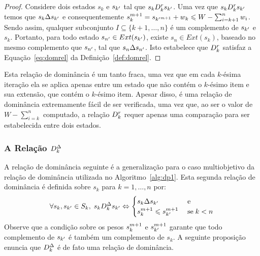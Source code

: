 \begin{proof}
  \noindent
      Considere dois estados $s_k$ e $s_{{k'}}$ tal que $s_k D_k^r s_{{k'}}$.
      Uma vez que $s_k D_k^r s_{{k'}}$ temos que $s_k \Delta s_{{k'}}$ e consequentemente
      $s_k^{m+1} = s_{{k'}^{m+1}} + w_k \leqslant W - \sum_{i=k+1}^n w_i$.
      Sendo assim, qualquer subconjunto $I \subseteq \{k+1, \ldots, n\}$ é um complemento
      de $s_{{k'}}$ e $s_k$.
      Portanto, para todo estado $s_{{n'}} \in Ext(s_{{k'}})$,
      existe $s_n \in Ext(s_k)$, baseado no mesmo complemento que $s_{{n'}}$,
      tal que $s_n \Delta s_{{n'}}$.
      Isto estabelece que $D_k^r$ satisfaz a Equação~\ref{eq:domrel} da
      Definição~\ref{def:domrel}.
    \qedhere
\end{proof}

Esta relação de dominância é um tanto fraca, uma vez que em cada $k$-ésima
iteração ela se aplica apenas entre um estado que não contém o $k$-ésimo item
e sua extensão, que contém o $k$-ésimo item.
Apesar disso, é uma relação de dominância extremamente fácil de ser verificada,
uma vez que, ao ser o valor de $W - \sum_{i=k}^n$ computado, a relação $D_k^r$
requer apenas uma comparação para ser estabelecida entre dois estados.

\subsubsection{A Relação $D_k^{\Delta}$}
A relação de dominância seguinte é a generalização para o caso multiobjetivo
da relação de dominância utilizada no Algoritmo~\ref{alg:dp1}.
Esta segunda relação de dominância é definida sobre $s_k$ para $k = 1, \ldots, n$ por:
\begin{displaymath}
  \forall s_k, s_{{k'}} \in S_k, \; s_k D_k^{\Delta} s_{{k'}}
    \Leftrightarrow
    \begin{cases}
      s_k \Delta s_{{k'}} \; & \text{e} \\
      s_k^{m+1} \leqslant s_{{k'}}^{m+1} \; & \text{se} \; k < n
    \end{cases}
\end{displaymath}
Observe que a condição sobre os pesos $s_k^{m+1}$ e $s_{{k'}}^{m+1}$
garante que todo complemento de $s_{{k'}}$ é também um complemento de
$s_k$.
A seguinte proposição enuncia que $D_k^{\Delta}$ é de fato uma relação de dominância.

